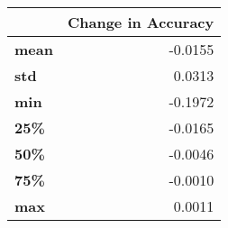 \begin{tabular}{lr}
\toprule
{} &  Change in Accuracy \\
\midrule
\textbf{mean} &             -0.0155 \\
\textbf{std } &              0.0313 \\
\textbf{min } &             -0.1972 \\
\textbf{25\% } &             -0.0165 \\
\textbf{50\% } &             -0.0046 \\
\textbf{75\% } &             -0.0010 \\
\textbf{max } &              0.0011 \\
\bottomrule
\end{tabular}
